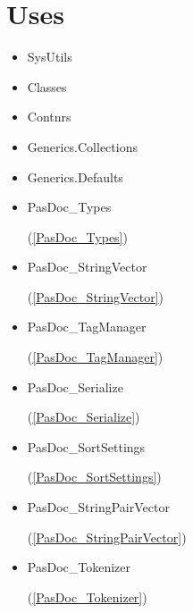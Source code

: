\documentclass{report}
\begin{document}
\section{Uses}
\begin{itemize}
\item \begin{ttfamily}SysUtils\end{ttfamily}\item \begin{ttfamily}Classes\end{ttfamily}\item \begin{ttfamily}Contnrs\end{ttfamily}\item \begin{ttfamily}Generics.Collections\end{ttfamily}\item \begin{ttfamily}Generics.Defaults\end{ttfamily}\item \begin{ttfamily}PasDoc{\_}Types\end{ttfamily}(\ref{PasDoc_Types})\item \begin{ttfamily}PasDoc{\_}StringVector\end{ttfamily}(\ref{PasDoc_StringVector})\item \begin{ttfamily}PasDoc{\_}TagManager\end{ttfamily}(\ref{PasDoc_TagManager})\item \begin{ttfamily}PasDoc{\_}Serialize\end{ttfamily}(\ref{PasDoc_Serialize})\item \begin{ttfamily}PasDoc{\_}SortSettings\end{ttfamily}(\ref{PasDoc_SortSettings})\item \begin{ttfamily}PasDoc{\_}StringPairVector\end{ttfamily}(\ref{PasDoc_StringPairVector})\item \begin{ttfamily}PasDoc{\_}Tokenizer\end{ttfamily}(\ref{PasDoc_Tokenizer})\end{itemize}
\end{document}
